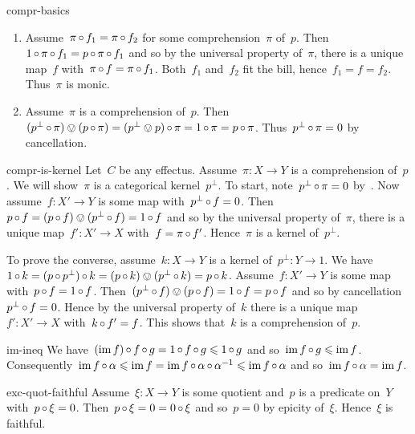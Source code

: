\begin{solution}{compr-basics}
\begin{enumerate}
    and for that map, we have~$0_Y \after 0 = 0 = f$
         and so~$0_Y$ is a comprehension for~$0$.
\item
Assume~$\pi \mathop{\circ} f_1 = \pi \mathop{\circ} f_2$ for some comprehension~$\pi$
    of~$p$.
Then~$1 \mathop{\circ} \pi \mathop{\circ} f_1
         = p \mathop{\circ} \pi \mathop{\circ} f_1$
    and so by the universal property of~$\pi$,
         there is a unique map~$f$ with~$\pi \mathop{\circ} f = \pi \mathop{\circ} f_1$.
         Both~$f_1$ and~$f_2$ fit the bill, hence~$f_1 =f = f_2$.
         Thus~$\pi$ is monic.
\item
Assume~$\pi$ is a comprehension of~$p$.
         Then~$(p^\perp \mathop{\circ} \pi) \ovee (p \mathop{\circ} \pi) = 
                (p^\perp \ovee p) \mathop{\circ} \pi = 1 \mathop{\circ} \pi =p \mathop{\circ} \pi$.
        Thus~$p^\perp \mathop{\circ} \pi = 0$ by cancellation.
\end{enumerate}
\end{solution}
\spacingfix{}
\begin{solution}{compr-is-kernel}%
Let~$C$ be any effectus.
Assume~$\pi\colon X \to Y$ is a comprehension of~$p$.
We will show~$\pi$ is a categorical kernel~$p^\perp$.
To start, note~$p^\perp \mathop{\circ} \pi = 0$ by~.
Now assume~$f\colon X' \to Y$ is some map with~$p^\perp \mathop{\circ} f = 0$.
    Then~$p \mathop{\circ} f = (p \mathop{\circ} f) \ovee (p^\perp \mathop{\circ} f)= 1 \mathop{\circ} f $
    and so by the universal property of~$\pi$,
    there is a unique map~$f'\colon X' \to X$ with~$f = \pi \mathop{\circ} f'$.
    Hence~$\pi$ is a kernel of~$p^\perp$.

To prove the converse, assume~$k\colon X \to Y$ is a kernel
        of~$p^\perp\colon Y \to 1$. 
We have~$1 \mathop{\circ} k = (p \mathop{\circ} p^\perp) \mathop{\circ} k = (p \mathop{\circ} k) \ovee (p^\perp \mathop{\circ} k)
            = p \mathop{\circ} k$.
Assume~$f\colon X' \to Y$ is some map with~$p \mathop{\circ} f = 1 \mathop{\circ} f$.
Then~$(p^\perp \mathop{\circ} f) \ovee (p \mathop{\circ} f) = 1 \mathop{\circ} f = p \mathop{\circ} f$
    and so by cancellation~$p^\perp \mathop{\circ} f = 0$.
Hence by the universal property of~$k$
    there is a unique map~$f'\colon X' \to X$
        with~$k \mathop{\circ} f' = f$.
    This shows that~$k$ is a comprehension of~$p$.
\end{solution}
\begin{solution}{im-ineq}%
We have~$(\operatorname{im} f ) \mathop{\circ} f \mathop{\circ} g = 1 \mathop{\circ} f \mathop{\circ} g \leqslant 1 \mathop{\circ} g$
    and so~$\operatorname{im} f \mathop{\circ} g \leqslant \operatorname{im} f$.
    Consequently~$\operatorname{im} f \mathop{\circ} \alpha \leqslant \operatorname{im} f
        = \operatorname{im} f \mathop{\circ} \alpha \mathop{\circ} \alpha^{-1}
        \leqslant \operatorname{im} f \mathop{\circ} \alpha$ and so~$\operatorname{im} f \mathop{\circ} \alpha  = \operatorname{im} f$.
\end{solution}
\begin{solution}{exc-quot-faithful}%
Assume~$\xi\colon X \to Y$ is some quotient and~$p$ is a predicate on~$Y$
    with~$p \mathop{\circ}\xi = 0$.
    Then~$p \mathop{\circ} \xi = 0 = 0 \mathop{\circ} \xi$
        and so~$p = 0$ by epicity of~$\xi$.
Hence~$\xi$ is faithful.
\end{solution}
